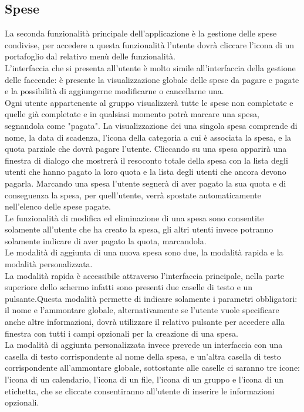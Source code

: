 \subsection{Spese}
La seconda funzionalità principale dell'applicazione è la gestione delle spese condivise, per accedere a questa funzionalità l'utente dovrà cliccare l'icona di un portafoglio dal relativo menù delle funzionalità.\\
L'interfaccia che si presenta all'utente è molto simile all'interfaccia della gestione delle faccende: è presente la visualizzazione globale delle spese da pagare e pagate e la possibilità di aggiungerne modificarne o cancellarne una.\\
Ogni utente appartenente al gruppo visualizzerà tutte le spese non completate e quelle già completate e in qualsiasi momento potrà marcare una spesa, segnandola come "pagata".
La visualizzazione dei una singola spesa comprende di nome, la data di scadenza, l'icona della categoria a cui è associata la spesa, e la quota parziale che dovrà pagare l'utente. Cliccando su una spesa apparirà una finestra di dialogo che mostrerà il resoconto totale della spesa con la lista degli utenti che hanno pagato la loro quota e la lista degli utenti che ancora devono pagarla. Marcando una spesa l'utente segnerà di aver pagato la sua quota e di conseguenza la spesa, per quell'utente, verrà spostate automaticamente nell'elenco delle spese pagate.\\
Le funzionalità di modifica ed eliminazione di una spesa sono consentite solamente all'utente che ha creato la spesa, gli altri utenti invece potranno solamente indicare di aver pagato la quota, marcandola.\\
Le modalità di aggiunta di una nuova spesa sono due, la modalità rapida e la modalità personalizzata.\\
La modalità rapida è accessibile attraverso l'interfaccia principale, nella parte superiore dello schermo infatti sono presenti due caselle di testo e un pulsante.Questa modalità permette di indicare solamente i parametri obbligatori: il nome e l'ammontare globale, alternativamente se l'utente vuole specificare anche altre informazioni, dovrà utilizzare il relativo pulsante per accedere alla finestra con tutti i campi opzionali per la creazione di una spesa.\\
La modalità di aggiunta personalizzata invece prevede un interfaccia con una casella di testo corrispondente al nome della spesa, e un'altra casella di testo corrispondente all'ammontare globale, sottostante alle caselle ci saranno tre icone: l'icona di un calendario, l'icona di un file, l'icona di un gruppo e l'icona di un etichetta, che se cliccate consentiranno all'utente di inserire le informazioni opzionali.

